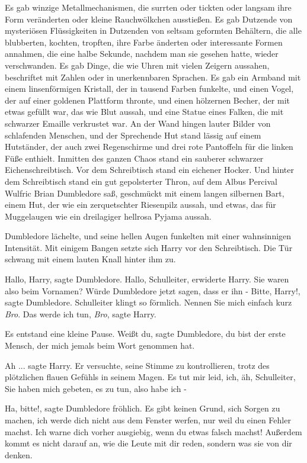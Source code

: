 Es gab winzige Metallmechanismen, die surrten oder tickten oder langsam ihre
Form veränderten oder kleine Rauchwölkchen ausstießen. Es gab Dutzende von
mysteriösen Flüssigkeiten in Dutzenden von seltsam geformten Behältern, die alle
blubberten, kochten, tropften, ihre Farbe änderten oder interessante Formen
annahmen, die eine halbe Sekunde, nachdem man sie gesehen hatte, wieder
verschwanden. Es gab Dinge, die wie Uhren mit vielen Zeigern aussahen,
beschriftet mit Zahlen oder in unerkennbaren Sprachen. Es gab ein Armband mit
einem linsenförmigen Kristall, der in tausend Farben funkelte, und einen Vogel,
der auf einer goldenen Plattform thronte, und einen hölzernen Becher, der mit
etwas gefüllt war, das wie Blut aussah, und eine Statue eines Falken, die mit
schwarzer Emaille verkrustet war. An der Wand hingen lauter Bilder von
schlafenden Menschen, und der Sprechende Hut stand lässig auf einem Hutständer,
der auch zwei Regenschirme und drei rote Pantoffeln für die linken Füße
enthielt. Inmitten des ganzen Chaos stand ein sauberer schwarzer
Eichenschreibtisch. Vor dem Schreibtisch stand ein eichener Hocker. Und hinter
dem Schreibtisch stand ein gut gepolsterter Thron, auf dem Albus Percival
Wulfric Brian Dumbledore saß, geschmückt mit einem langen silbernen Bart, einem
Hut, der wie ein zerquetschter Riesenpilz aussah, und etwas, das für Muggelaugen
wie ein dreilagiger hellrosa Pyjama aussah.

Dumbledore lächelte, und seine hellen Augen funkelten mit einer wahnsinnigen
Intensität. Mit einigem Bangen setzte sich Harry vor den Schreibtisch. Die Tür
schwang mit einem lauten Knall hinter ihm zu.

\glqq{}Hallo, Harry\grqq{}, sagte Dumbledore. \glqq{}Hallo, Schulleiter\grqq{},
erwiderte Harry. Sie waren also beim Vornamen? Würde Dumbledore jetzt sagen,
dass er ihn - \glqq{}Bitte, Harry!\grqq{}, sagte Dumbledore. \glqq{}Schulleiter
klingt so förmlich. Nennen Sie mich einfach kurz \emph{Bro}.\grqq{} \glqq{}Das
werde ich tun, \emph{Bro}\grqq{}, sagte Harry.

Es entstand eine kleine Pause. \glqq{}Weißt du\grqq{}, sagte Dumbledore, \glqq{}du
bist der erste Mensch, der mich jemals beim Wort genommen hat.\grqq{}

\glqq{}Ah ...\grqq{} sagte Harry. Er versuchte, seine Stimme zu kontrollieren,
trotz des plötzlichen flauen Gefühls in seinem Magen. \glqq{}Es tut mir leid,
ich, äh, Schulleiter, Sie haben mich gebeten, es zu tun, also habe ich -\grqq{}

\glqq{}Ha, bitte!\grqq{}, sagte Dumbledore fröhlich. \glqq{}Es gibt keinen Grund,
sich Sorgen zu machen, ich werde dich nicht aus dem Fenster werfen, nur weil du
einen Fehler machst. Ich warne dich vorher ausgiebig, wenn du etwas falsch
machst! Außerdem kommt es nicht darauf an, wie die Leute mit dir reden, sondern
was sie von dir denken.\grqq{}

